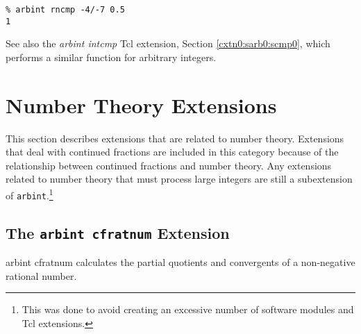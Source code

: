 \begin{tclcommandsampleinvocations}
\begin{scriptsize}
\begin{verbatim}
% arbint rncmp -4/-7 0.5
1
\end{verbatim}
\end{scriptsize}
\end{tclcommandsampleinvocations}


\begin{tclcommandseealso}
See also the \emph{arbint intcmp} Tcl extension,
Section \ref{cxtn0:sarb0:scmp0}, which performs a similar
function for arbitrary integers.
\end{tclcommandseealso}


\section{Number Theory Extensions}
\label{cxtn0:snth0}

This section describes extensions that are related to number theory.
Extensions that deal with continued fractions are included in this
category because of the relationship between continued fractions
and number theory.  Any extensions related to number theory that 
must process large integers are
still a subextension of \texttt{arbint}.\footnote{This was done to
avoid creating an excessive number of software modules and 
Tcl extensions.}


\subsection{The \texttt{arbint cfratnum} Extension}
\label{cxtn0:snth0:scfr0}

\begin{tclcommandname}{arbint cfratnum}%
calculates the partial quotients and convergents of
a non-negative rational number.
\end{tclcommandname}

